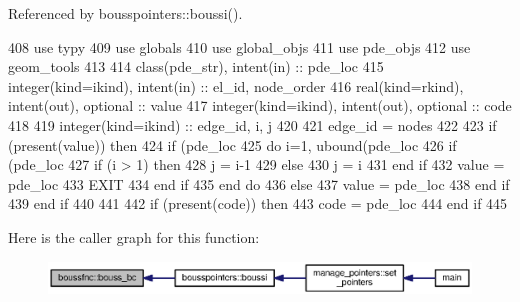 Referenced by bousspointers\+::boussi().


\begin{DoxyCode}
408         \textcolor{keywordtype}{use }typy
409         \textcolor{keywordtype}{use }globals
410         \textcolor{keywordtype}{use }global_objs
411         \textcolor{keywordtype}{use }pde_objs
412         \textcolor{keywordtype}{use }geom_tools
413 
414         \textcolor{keywordtype}{class}(pde_str), \textcolor{keywordtype}{intent(in)} :: pde\_loc
415         \textcolor{keywordtype}{integer(kind=ikind)}, \textcolor{keywordtype}{intent(in)}  :: el\_id, node\_order
416         \textcolor{keywordtype}{real(kind=rkind)}, \textcolor{keywordtype}{intent(out)}, \textcolor{keywordtype}{optional}   :: value
417         \textcolor{keywordtype}{integer(kind=ikind)}, \textcolor{keywordtype}{intent(out)}, \textcolor{keywordtype}{optional} :: code
418         
419         \textcolor{keywordtype}{integer(kind=ikind)} :: edge\_id, i, j
420         
421         edge\_id = nodes%
422         
423         \textcolor{keywordflow}{if} (\textcolor{keyword}{present}(\textcolor{keywordtype}{value})) \textcolor{keywordflow}{then}
424           \textcolor{keywordflow}{if} (pde\_loc%
425             \textcolor{keywordflow}{do} i=1, ubound(pde\_loc%
426               \textcolor{keywordflow}{if} (pde\_loc%
427                 \textcolor{keywordflow}{if} (i > 1) \textcolor{keywordflow}{then}
428                   j = i-1
429                 \textcolor{keywordflow}{else}
430                   j = i
431 \textcolor{keywordflow}{                end if}
432                 \textcolor{keywordtype}{value} = pde\_loc%
433                 \textcolor{keywordflow}{EXIT}
434 \textcolor{keywordflow}{              end if}
435 \textcolor{keywordflow}{            end do}
436           \textcolor{keywordflow}{else}
437             \textcolor{keywordtype}{value} =  pde\_loc%
438 \textcolor{keywordflow}{          end if}
439 \textcolor{keywordflow}{        end if}
440         
441         
442         \textcolor{keywordflow}{if} (\textcolor{keyword}{present}(code)) \textcolor{keywordflow}{then}
443           code = pde\_loc%
444 \textcolor{keywordflow}{        end if}
445         
\end{DoxyCode}


Here is the caller graph for this function\+:\nopagebreak
\begin{figure}[H]
\begin{center}
\leavevmode
\includegraphics[width=350pt]{namespaceboussfnc_a664047715b553e05dbdc2d14b481e6fa_icgraph}
\end{center}
\end{figure}


